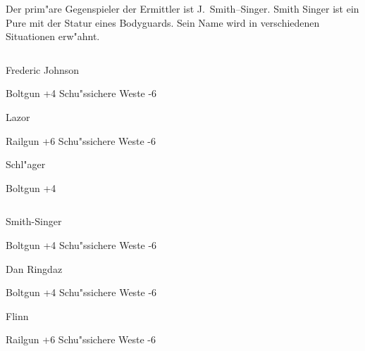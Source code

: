 Der prim"are Gegenspieler der Ermittler ist J.~Smith--Singer. Smith Singer ist ein Pure mit der Statur eines Bodyguards. Sein Name wird in verschiedenen Situationen erw"ahnt.
\vfill
\pagebreak

\begin{column}[l]{0.45}
    \begin{nscsheet}[h]{Frederic Johnson}
        \nscstats[ATT=3,AGG=4,EMP=4,KNO=5,HP=10]
        \nscruler
        \begin{nscinventory}
            \nscitem[Waffen] Boltgun +4
            \nscitem[R"ustung] Schu"ssichere Weste -6           
        \end{nscinventory}
    \end{nscsheet}

    \begin{nscsheet}[h]{Lazor}
        \nscstats[ATT=6,AGG=5,EMP=2,KNO=4,HP=12]
        \nscruler
        \begin{nscinventory}
            \nscitem[Waffen] Railgun +6
            \nscitem[R"ustung] Schu"ssichere Weste -6           
        \end{nscinventory}
    \end{nscsheet}


    \begin{nscsheet}[h]{Schl"ager}
        \nscstats[ATT=3,AGG=2,EMP=1,KNO=1,HP=10]
        \nscruler
        \begin{nscinventory}
            \nscitem[Waffen] Boltgun +4            
        \end{nscinventory}
    \end{nscsheet}    
\end{column}
\begin{column}[r]{0.45}
    \begin{nscsheet}[h]{Smith-Singer}
        \nscstats[ATT=7,AGG=7,EMP=7,KNO=5,HP=12]
        \nscruler
        \begin{nscinventory}
            \nscitem[Waffen] Boltgun +4
            \nscitem[R"ustung] Schu"ssichere Weste -6           
        \end{nscinventory}
    \end{nscsheet}

    \begin{nscsheet}[h]{Dan Ringdaz}
        \nscstats[ATT=4,AGG=4,EMP=4,KNO=5,HP=10]
        \nscruler
        \begin{nscinventory}
            \nscitem[Waffen] Boltgun +4
            \nscitem[R"ustung] Schu"ssichere Weste -6           
        \end{nscinventory}
    \end{nscsheet}

    \begin{nscsheet}[h]{Flinn}
        \nscstats[ATT=6,AGG=5,EMP=2,KNO=4,HP=12]
        \nscruler
        \begin{nscinventory}
            \nscitem[Waffen] Railgun +6
            \nscitem[R"ustung] Schu"ssichere Weste -6           
        \end{nscinventory}
    \end{nscsheet}
\end{column}
\vfill
\pagebreak


